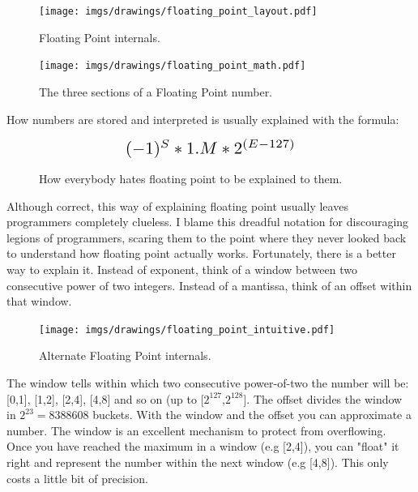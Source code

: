 \documentclass[book.tex]{subfiles}
\begin{document}
\begin{figure}[H]
\centering
\texttt{[image: imgs/drawings/floating\_point\_layout.pdf]}
\caption{Floating Point internals.}
\end{figure}
  \bigskip



\begin{figure}[H]
\centering
\texttt{[image: imgs/drawings/floating\_point\_math.pdf]}
\caption{The three sections of a Floating Point number.}
\end{figure}
  \bigskip  


How numbers are stored and interpreted is usually explained with the formula:\\
\par
\begin{figure}[H]
\begin{equation*}\label{eq:fp}
\scalebox{1.5}{
$(-1)^S * 1.M * 2^{(E-127)}$
}
\end{equation*}
 \caption{How everybody hates floating point to be explained to them.}
\end{figure}
\bigskip  

Although correct, this way of explaining floating point usually leaves programmers completely clueless. I blame this dreadful notation for discouraging legions of programmers, scaring them to the point where they never looked back to understand how floating point actually works. Fortunately, there is a better way to explain it. Instead of exponent, think of a window between two consecutive power of two integers. Instead of a mantissa, think of an offset within that window.\\ 
\par
  
\begin{figure}[H]
\centering
\texttt{[image: imgs/drawings/floating\_point\_intuitive.pdf]}
\caption{Alternate Floating Point internals.}
\end{figure}
  \bigskip  
The window tells within which two consecutive power-of-two the number will be: [0,1], [1,2], [2,4], [4,8] and so on (up to [$2^{127}$,$2^{128}$]. The offset divides the window in $ 2^{23} = 8388608 $  buckets. With the window and the offset you can approximate a number. The window is an excellent mechanism to protect from overflowing. Once you have reached the maximum in a window (e.g [2,4]), you can "float" it right and represent the number within the next window (e.g [4,8]). This only costs a little bit of precision.\\
\end{document}
